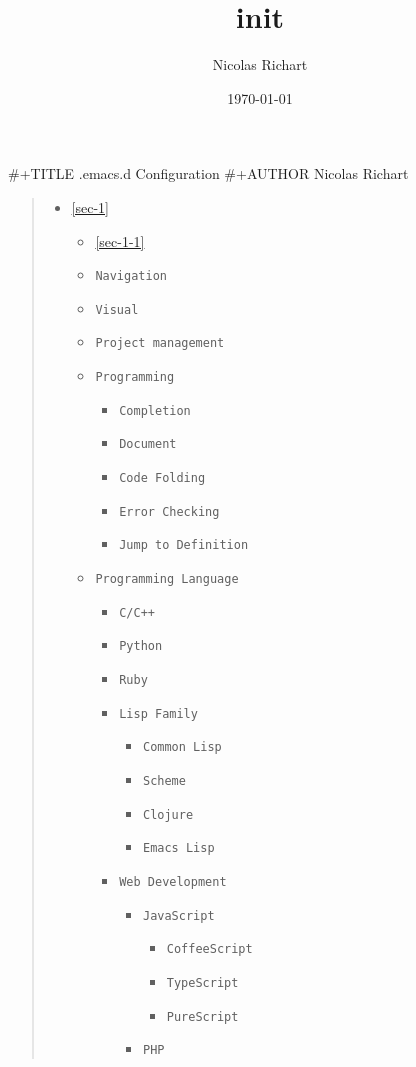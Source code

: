 \documentclass[11pt]{article}
\author{Nicolas Richart}
\date{\today}
\title{init}
\begin{document}
\maketitle
\tableofcontents

\#+TITLE .emacs.d Configuration
\#+AUTHOR Nicolas Richart
\begin{quote}
\begin{itemize}
\item \ref{sec-1}
\begin{itemize}
\item \ref{sec-1-1}
\item \texttt{Navigation}
\item \texttt{Visual}
\item \texttt{Project management}
\item \texttt{Programming}
\begin{itemize}
\item \texttt{Completion}
\item \texttt{Document}
\item \texttt{Code Folding}
\item \texttt{Error Checking}
\item \texttt{Jump to Definition}
\end{itemize}
\item \texttt{Programming Language}
\begin{itemize}
\item \texttt{C/C++}
\item \texttt{Python}
\item \texttt{Ruby}
\item \texttt{Lisp Family}
\begin{itemize}
\item \texttt{Common Lisp}
\item \texttt{Scheme}
\item \texttt{Clojure}
\item \texttt{Emacs Lisp}
\end{itemize}
\item \texttt{Web Development}
\begin{itemize}
\item \texttt{JavaScript}
\begin{itemize}
\item \texttt{CoffeeScript}
\item \texttt{TypeScript}
\item \texttt{PureScript}
\end{itemize}
\item \texttt{PHP}

\end{itemize}
\end{itemize}
\end{itemize}
\end{itemize}
\end{quote}
\end{document}
